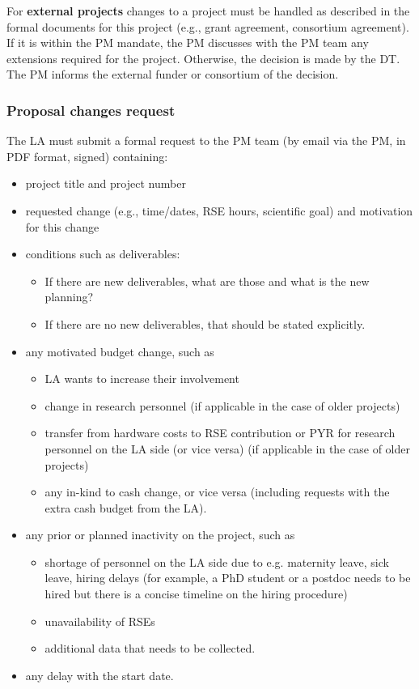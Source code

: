 For \textbf{external projects} changes to a project must be handled as described in the formal documents for this
project (e.g., grant agreement, consortium agreement). If it is within the PM mandate, the PM discusses with the PM
team any extensions required for the project. Otherwise, the decision is made by the DT. The PM informs the external
funder or consortium of the decision.

\subsubsection{Proposal changes request}
The LA must submit a formal request to the PM team (by email via the PM, in PDF format, signed) containing:

\begin{itemize}
\item project title and project number
\item requested change (e.g., time/dates, RSE hours, scientific goal) and motivation for this change
\item conditions such as deliverables: 
\begin{itemize}
\item If there are new deliverables, what are those and what is the new planning? 
\item If there are no new deliverables, that should be stated explicitly.
\end{itemize}
\item any motivated budget change, such as 
\begin{itemize}
\item LA wants to increase their involvement 
\item change in research personnel (if applicable in the case of older projects)
\item transfer from hardware costs to RSE contribution or PYR for research personnel on the LA side (or vice versa) (if
applicable in the case of older projects)
\item any in-kind to cash change, or vice versa (including requests with the extra cash budget from the LA).
\end{itemize}
\item any prior or planned inactivity on the project, such as
\begin{itemize}
\item shortage of personnel on the LA side due to e.g. maternity leave, sick leave, hiring delays (for example, a PhD student
or a postdoc needs to be hired but there is a concise timeline on the hiring procedure)
\item unavailability of RSEs 
\item additional data that needs to be collected.
\end{itemize}
\item any delay with the start date.
\end{itemize}



